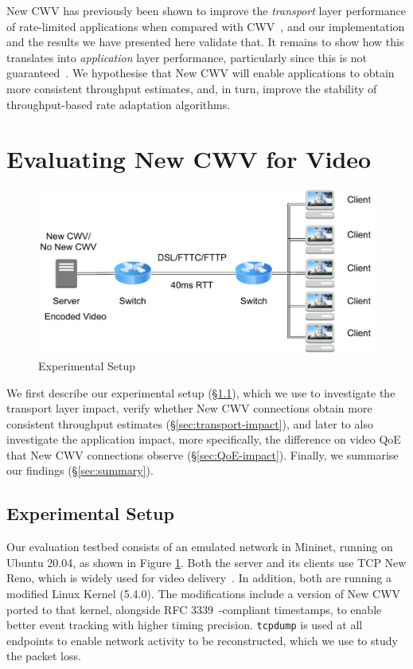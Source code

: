 \documentclass[10pt,sigconf,anonymous]{acmart}
\begin{document}
New CWV has previously been shown to improve the \emph{transport} layer performance of rate-limited applications when compared with CWV~\cite{Nazir-2014-performance-evaluation-congestion-window-validation-dash-newcwv}, and our implementation and the results we have presented here validate that. It remains to show how this translates into \emph{application} layer performance, particularly since this is not guaranteed~\cite{Spiteri-2016-BOLA}. We hypothesise that New CWV will enable applications to obtain more consistent throughput estimates, and, in turn, improve the stability of throughput-based rate adaptation algorithms.

\section{Evaluating New CWV for Video}
\label{sec:evaluation}

\begin{figure}
  \centering
  \includegraphics[width=.5\textwidth]{figures/setup.pdf}
  \caption{Experimental Setup}
  \label{fig:experimental-setup}
\end{figure}

We first describe our experimental setup (\S\ref{sec:experimental-setup}), which we use to investigate the transport layer impact, verify whether New CWV connections obtain more consistent throughput estimates (\S\ref{sec:transport-impact}), and later to also investigate the application impact, more specifically, the difference on video QoE that New CWV connections observe (\S\ref{sec:QoE-impact}). Finally, we summarise our findings (\S\ref{sec:summary}).

\subsection{Experimental Setup}
\label{sec:experimental-setup}



Our evaluation testbed consists of an emulated network in Mininet, running on Ubuntu 20.04, as shown in Figure \ref{fig:experimental-setup}. Both the server and its clients use TCP New Reno, which is widely used for video delivery~\cite{Mishra-2019-the-great-internet-tcp-congestion-control-census}. In addition, both are running a modified Linux Kernel (5.4.0). The modifications include a version of New CWV ported to that kernel, alongside RFC 3339~\cite{rfc3339-precise-timestamps}-compliant timestamps, to enable better event tracking with higher timing precision. \texttt{tcpdump} is used at all endpoints to enable network activity to be reconstructed, which we use to study the packet loss.
\end{document}
